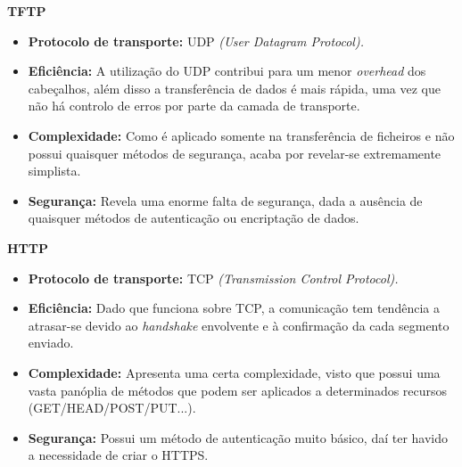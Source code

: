         \textbf{\large TFTP}
        \begin{itemize}
            
            \item \textbf{Protocolo de transporte:} UDP \textit{(User Datagram Protocol).}
            
            \item \textbf{Eficiência:} A utilização do UDP contribui para um menor \textit{overhead} dos cabeçalhos, além disso a transferência de dados é mais rápida, uma vez que não há controlo de erros por parte da camada de transporte.
            
            \item \textbf{Complexidade:} Como é aplicado somente na transferência de ficheiros e não possui quaisquer métodos de segurança, acaba por revelar-se extremamente simplista.
            
            \item \textbf{Segurança:} Revela uma enorme falta de segurança, dada a ausência de quaisquer métodos de autenticação ou encriptação de dados.

        \end{itemize}

        \textbf{\large HTTP}
        \begin{itemize}
         
            \item \textbf{Protocolo de transporte:} TCP \textit{(Transmission Control Protocol).} 
            
            \item \textbf{Eficiência:} Dado que funciona sobre TCP, a comunicação tem tendência a atrasar-se devido ao \textit{handshake} envolvente e à confirmação da cada segmento enviado.
            
            \item \textbf{Complexidade:} Apresenta uma certa complexidade, visto que possui uma vasta panóplia de métodos que podem ser aplicados a determinados recursos (GET/HEAD/POST/PUT...).
            
            \item \textbf{Segurança:} Possui um método de autenticação muito básico, daí ter havido a necessidade de criar o HTTPS.  
        
        \end{itemize}